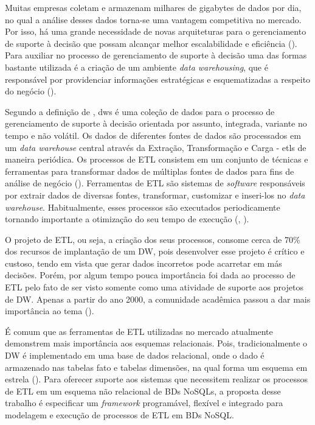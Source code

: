 Muitas empresas coletam e armazenam milhares de gigabytes de dados por dia, no qual a análise desses dados torna-se uma vantagem competitiva no mercado. Por isso, há uma grande necessidade de novas arquiteturas para o gerenciamento de suporte à decisão que possam alcançar melhor escalabilidade e eficiência (\cite{liu:2013}). Para auxiliar no processo de gerenciamento de suporte à decisão uma das formas bastante utilizada é a criação de um ambiente \textit{data warehousing}, que é responsável por providenciar informações estratégicas e esquematizadas a respeito do negócio (\cite{dayal:1997}).

Segundo a definição de \cite{kimball:2002}, \acp{dw} é uma coleção de dados para o processo de gerenciamento de suporte à decisão orientada por assunto, integrada, variante no tempo e não volátil. Os dados de diferentes fontes de dados são processados em um \textit{data warehouse} central através da Extração, Transformação e Carga - \acp{etl} de maneira periódica. Os processos de ETL consistem em um conjunto de técnicas e ferramentas para transformar dados de múltiplas fontes de dados para fins de análise de negócio (\cite{silva:2016}). Ferramentas de ETL são sistemas de \textit{software} responsáveis por extrair dados de diversas fontes, transformar, customizar e inseri-los no \textit{data warehouse}. Habitualmente, esses processos são executados periodicamente tornando importante a otimização do seu tempo de execução (\cite{vassiliadis:2005}, \cite{silva:2016}).

O projeto de ETL, ou seja, a criação dos seus processos, consome cerca de 70\% dos recursos de implantação de um DW, pois desenvolver esse projeto é crítico e custoso, tendo em vista que gerar dados incorretos pode acarretar em más decisões. Porém, por algum tempo pouca importância foi dada ao processo de ETL pelo fato de ser visto somente como uma atividade de suporte aos projetos de DW. Apenas a partir do ano 2000, a comunidade acadêmica passou a dar mais importância ao tema (\cite{silva:2012}).

É comum que as ferramentas de ETL utilizadas no mercado atualmente demonstrem mais importância aos esquemas relacionais. Pois, tradicionalmente o DW é implementado em uma base de dados relacional, onde o dado é armazenado nas tabelas fato e tabelas dimensões, na qual forma um esquema em estrela (\cite{kimball:2002}). Para oferecer suporte aos sistemas que necessitem realizar os processos de ETL em um esquema não relacional de \acp{BDs NoSQL}, a proposta desse trabalho é especificar um \textit{framework} programável, flexível e integrado para modelagem e execução de processos de ETL em BDs NoSQL.


